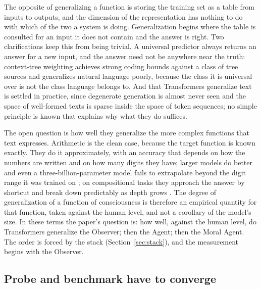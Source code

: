The opposite of generalizing a function is storing the training set as a table from inputs to outputs,
and the dimension of the representation has nothing to do with which of the two a system is doing.
Generalization begins where the table is consulted for an input it does not contain and the answer is
right. Two clarifications keep this from being trivial. A universal predictor always returns an answer
for a new input, and the answer need not be anywhere near the truth: context-tree weighting achieves
strong coding bounds against a class of tree sources \citep{willems1995} and generalizes natural
language poorly, because the class it is universal over is not the class language belongs to. And that
Transformers generalize text is settled in practice, since degenerate generation is almost never seen
and the space of well-formed texts is sparse inside the space of token sequences; no simple principle
is known that explains why what they do suffices.

The open question is how well they generalize the more complex functions that text expresses.
Arithmetic is the clean case, because the target function is known exactly. They do it approximately,
with an accuracy that depends on how the numbers are written and on how many digits they have; larger
models do better and even a three-billion-parameter model fails to extrapolate beyond the digit range it
was trained on \citep{nogueira2021}; on compositional tasks they approach the answer by shortcut and
break down predictably as depth grows \citep{dziri2023}. The degree of generalization of a function of
consciousness is therefore an empirical quantity for that function, taken against the human level, and
not a corollary of the model's size. In these terms the paper's question is: how well, against the
human level, do Transformers generalize the Observer; then the Agent; then the Moral Agent. The order
is forced by the stack (Section~\ref{sec:stack}), and the measurement begins with the Observer.

\subsection{Probe and benchmark have to converge}
\label{sec:twomeasurements}

